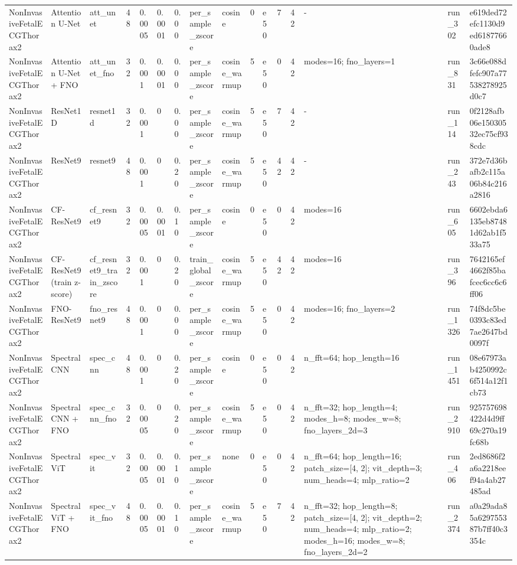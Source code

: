 \begin{longtable}{llllllllllllllll}
NonInvasiveFetalECGThorax2 & Attention U-Net & att\_unet & 48 & 0.0005 & 0.0001 & 0.00 & per\_sample\_zscore & cosine & 0 & e50 & 7 & 42 & - & run\_302 & e619ded72efc1130d9ed61877660ade8 \\
NonInvasiveFetalECGThorax2 & Attention U-Net + FNO & att\_unet\_fno & 32 & 0.001 & 0.0001 & 0.00 & per\_sample\_zscore & cosine\_warmup & 5 & e50 & 0 & 42 & modes=16; fno\_layers=1 & run\_831 & 3c66e088dfefc907a77538278925d0c7 \\
NonInvasiveFetalECGThorax2 & ResNet1D & resnet1d & 32 & 0.001 & 0 & 0.00 & per\_sample\_zscore & cosine\_warmup & 5 & e50 & 7 & 42 & - & run\_114 & 0f2128afb06e15030532ec75cf938cdc \\
NonInvasiveFetalECGThorax2 & ResNet9 & resnet9 & 48 & 0.001 & 0 & 0.20 & per\_sample\_zscore & cosine\_warmup & 5 & e50 & 42 & 42 & - & run\_243 & 372e7d36bafb2c115a06b84c216a2816 \\
NonInvasiveFetalECGThorax2 & CF-ResNet9 & cf\_resnet9 & 32 & 0.0005 & 0.0001 & 0.10 & per\_sample\_zscore & cosine & 0 & e50 & 0 & 42 & modes=16 & run\_605 & 6602ebda6135eb87481d62ab1f533a75 \\
NonInvasiveFetalECGThorax2 & CF-ResNet9 (train z-score) & cf\_resnet9\_train\_zscore & 32 & 0.001 & 0 & 0.20 & train\_global\_zscore & cosine\_warmup & 5 & e50 & 42 & 42 & modes=16 & run\_396 & 7642165ef4662f85bafcec6cc6c6ff06 \\
NonInvasiveFetalECGThorax2 & FNO-ResNet9 & fno\_resnet9 & 48 & 0.001 & 0 & 0.00 & per\_sample\_zscore & cosine\_warmup & 5 & e50 & 0 & 42 & modes=16; fno\_layers=2 & run\_1326 & 74f8dc5be0393c83ed7ae2647bd0097f \\
NonInvasiveFetalECGThorax2 & Spectral CNN & spec\_cnn & 48 & 0.001 & 0 & 0.20 & per\_sample\_zscore & cosine & 0 & e50 & 0 & 42 & n\_fft=64; hop\_length=16 & run\_1451 & 08e67973ab4250992c6f514a12f1cb73 \\
NonInvasiveFetalECGThorax2 & Spectral CNN + FNO & spec\_cnn\_fno & 32 & 0.0005 & 0 & 0.20 & per\_sample\_zscore & cosine\_warmup & 5 & e50 & 0 & 42 & n\_fft=32; hop\_length=4; modes\_h=8; modes\_w=8; fno\_layers\_2d=3 & run\_2910 & 925757698422d4d9ff69c270a19fc68b \\
NonInvasiveFetalECGThorax2 & Spectral ViT & spec\_vit & 32 & 0.0005 & 0.0001 & 0.10 & per\_sample\_zscore & none & 0 & e50 & 0 & 42 & n\_fft=64; hop\_length=16; patch\_size=[4, 2]; vit\_depth=3; num\_heads=4; mlp\_ratio=2 & run\_406 & 2ed8686f2a6a2218eef94a4ab27485ad \\
NonInvasiveFetalECGThorax2 & Spectral ViT + FNO & spec\_vit\_fno & 48 & 0.0005 & 0.0001 & 0.10 & per\_sample\_zscore & cosine\_warmup & 5 & e50 & 7 & 42 & n\_fft=32; hop\_length=8; patch\_size=[4, 2]; vit\_depth=2; num\_heads=4; mlp\_ratio=2; modes\_h=16; modes\_w=8; fno\_layers\_2d=2 & run\_2374 & a0a29ada85a629755387b7ff40c3354c \\

\end{longtable}

